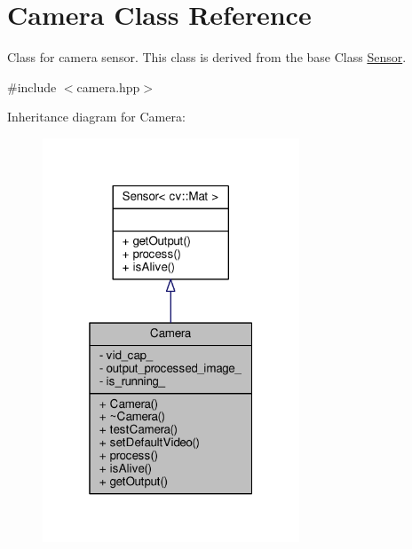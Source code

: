 \hypertarget{class_camera}{}\section{Camera Class Reference}
\label{class_camera}


Class for camera sensor. This class is derived from the base Class \hyperlink{class_sensor}{Sensor}.  




{\ttfamily \#include $<$camera.\+hpp$>$}



Inheritance diagram for Camera\+:
\nopagebreak
\begin{figure}[H]
\begin{center}
\leavevmode
\includegraphics[width=217pt]{class_camera__inherit__graph}
\end{center}
\end{figure}
